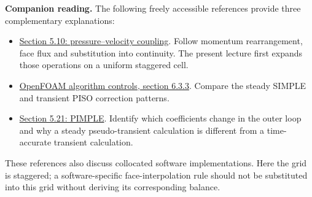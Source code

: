 \textbf{Companion reading.} The following freely accessible references provide
three complementary explanations:
\begin{itemize}
\item \href{https://doc.cfd.direct/notes/cfd-general-principles/pressure-velocity-coupling}{Section 5.10: pressure--velocity coupling}. Follow momentum rearrangement, face flux and substitution into continuity. The present lecture first expands those operations on a uniform staggered cell.
\item \href{https://www.openfoam.com/documentation/user-guide/6-solving/6.3-solution-and-algorithm-control}{OpenFOAM algorithm controls, section 6.3.3}. Compare the steady SIMPLE and transient PISO correction patterns.
\item \href{https://doc.cfd.direct/notes/cfd-general-principles/the-pimple-algorithm}{Section 5.21: PIMPLE}. Identify which coefficients change in the outer loop and why a steady pseudo-transient calculation is different from a time-accurate transient calculation.
\end{itemize}
These references also discuss collocated software implementations. Here the
grid is staggered; a software-specific face-interpolation rule should not be
substituted into this grid without deriving its corresponding balance.
